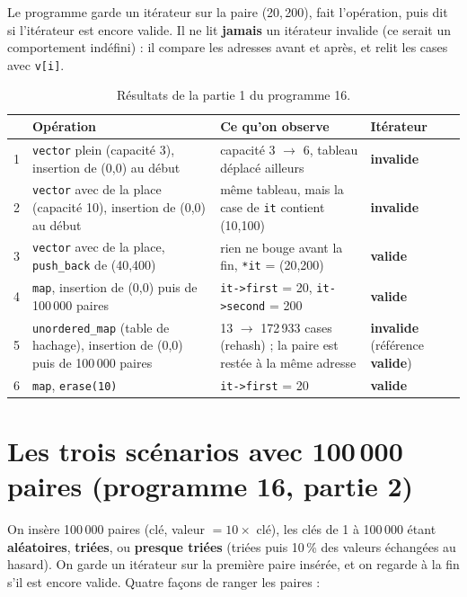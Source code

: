 \documentclass[11pt,a4paper]{article}
\newcommand{\oui}{\textcolor{vert}{\textbf{valide}}}
\newcommand{\non}{\textcolor{rouge}{\textbf{invalide}}}
\begin{document}
Le programme garde un itérateur sur la paire (20,\,200), fait l'opération, puis dit si
l'itérateur est encore valide. Il ne lit \textbf{jamais} un itérateur invalide (ce serait un
comportement indéfini) : il compare les adresses avant et après, et relit les cases avec
\texttt{v[i]}.

\begin{table}[H]
\centering
\small
\begin{tabular}{|c|p{5.4cm}|p{5.2cm}|p{2.6cm}|}
\hline
& \textbf{Opération} & \textbf{Ce qu'on observe} & \textbf{Itérateur} \\
\hline
1 & \texttt{vector} plein (capacité 3), insertion de (0,0) au début
  & capacité 3 $\to$ 6, tableau déplacé ailleurs & \non \\
\hline
2 & \texttt{vector} avec de la place (capacité 10), insertion de (0,0) au début
  & même tableau, mais la case de \texttt{it} contient (10,100) & \non \\
\hline
3 & \texttt{vector} avec de la place, \texttt{push\_back} de (40,400)
  & rien ne bouge avant la fin, \texttt{*it} = (20,200) & \oui \\
\hline
4 & \texttt{map}, insertion de (0,0) puis de 100\,000 paires
  & \texttt{it->first} = 20, \texttt{it->second} = 200 & \oui \\
\hline
5 & \texttt{unordered\_map} (table de hachage), insertion de (0,0) puis de 100\,000 paires
  & 13 $\to$ 172\,933 cases (rehash) ; la paire est restée à la même adresse
  & \non{} (référence \oui) \\
\hline
6 & \texttt{map}, \texttt{erase(10)}
  & \texttt{it->first} = 20 & \oui \\
\hline
\end{tabular}
\caption{Résultats de la partie 1 du programme 16.}
\end{table}

\section{Les trois scénarios avec 100\,000 paires (programme 16, partie 2)}

On insère 100\,000 paires (clé, valeur $= 10 \times$ clé), les clés de 1 à 100\,000 étant
\textbf{aléatoires}, \textbf{triées}, ou \textbf{presque triées} (triées puis 10\,\% des
valeurs échangées au hasard). On garde un itérateur sur la première paire insérée, et on
regarde à la fin s'il est encore valide. Quatre façons de ranger les paires :
\end{document}
